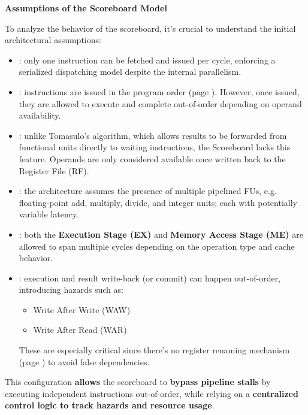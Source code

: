 \highspace
\begin{flushleft}
    \textcolor{Red2}{ \textbf{Assumptions of the Scoreboard Model}}
\end{flushleft}
To analyze the behavior of the scoreboard, it's crucial to understand the initial architectural assumptions:
\begin{itemize}
    \item {}: only one instruction can be fetched and issued per cycle, enforcing a serialized dispatching model despite the internal parallelism.
    \item {}: instructions are issued in the program order (page \pageref{def: in-order issue}). However, once issued, they are allowed to execute and complete out-of-order depending on operand availability.
    \item {}: unlike Tomasulo's algorithm, which allows results to be forwarded from functional units directly to waiting instructions, the Scoreboard lacks this feature. Operands are only considered available once written back to the Register File (RF).
    \item {}: the architecture assumes the presence of multiple pipelined FUs, e.g. floating-point add, multiply, divide, and integer units; each with potentially variable latency.
    \item {}: both the \textbf{Execution Stage (EX)} and \textbf{Memory Access Stage (ME)} are allowed to span multiple cycles depending on the operation type and cache behavior.
    \item {}: execution and result write-back (or commit) can happen out-of-order, introducing hazards such as:
    \begin{itemize}
        \item Write After Write (WAW)
        \item Write After Read (WAR)
    \end{itemize}
    These are especially critical since there's no register renaming mechanism (page \pageref{def: Register Renaming}) to avoid false dependencies.
\end{itemize}
This configuration \textbf{allows} the scoreboard to \textbf{bypass pipeline stalls} by executing independent instructions out-of-order, while relying on a \textbf{centralized control logic to track hazards and resource usage}.

